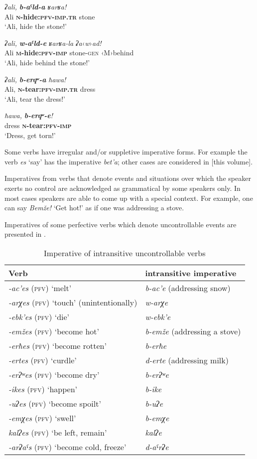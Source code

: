 ﻿\documentclass[output=paper]{langsci/langscibook}
\begin{document}
\ex %
\gll \emph{ʡali,} \emph{\textbf{b-aˤld-a}} \emph{ʁarʁa!}\\
Ali \textbf{\textsc{n}-hide:\textsc{pfv}-\textsc{imp}.\textsc{tr}} stone\\
\glt `Ali, hide the stone!'

\ex %
\gll \emph{ʡali,} \emph{\textbf{w-aˤld-e}} \emph{ʁarʁa-la} \emph{ʡa}‹\emph{w}›\emph{ad!}\\
Ali \textbf{\textsc{m}-hide:\textsc{pfv}-\textsc{imp}} stone-\textsc{gen} ‹M›behind\\
\glt `Ali, hide behind the stone!'

\ex %
\gll \emph{ʡali,} \emph{\textbf{b-erqʷ-a}} \emph{ħawa!}\\
Ali, \textbf{\textsc{n}-tear:\textsc{pfv}-\textsc{imp}.\textsc{tr}} dress\\
\glt `Ali, tear the dress!'

\ex %
\gll \emph{ħawa,} \emph{\textbf{b-erqʷ-e}!}\\
dress \textbf{\textsc{n}-tear:\textsc{pfv}-\textsc{imp}}\\
\glt `Dress, get torn!'
\z

Some verbs have irregular and/or suppletive imperative forms. For
example the verb \emph{es} `say' has the imperative \emph{bet'a}; other
cases are considered in \citet{daniel2019} [this volume].

Imperatives from verbs that denote events and situations over which
the speaker exerts no control are acknowledged as grammatical by some
speakers only. In most cases speakers are able to come up with a special
context. For example, one can say \emph{Bemže!} `Get hot!' as if one was addressing a stove.

Imperatives of some perfective verbs which denote uncontrollable events
are presented in .

\begin{table}
  \caption{Imperative of intransitive uncontrollable verbs}\label{tab:5:2}

  \begin{tabular}{@{}ll@{}}
\toprule
Verb & intransitive imperative\tabularnewline \midrule
\emph{-ac'es} (\textsc{pfv}) `melt' & \emph{b-ac'e} (addressing snow)\tabularnewline
\emph{-arχes} (\textsc{pfv}) `touch' (unintentionally) & \emph{w-arχe} \tabularnewline
\emph{-ebk'es} (\textsc{pfv}) `die' & \emph{w-ebk'e} \tabularnewline
\emph{-emžes} (\textsc{pfv}) `become hot' & \emph{b-emže} (addressing a stove) \tabularnewline
\emph{-erħes} (\textsc{pfv}) `become rotten' & \emph{b-erħe} \tabularnewline
\emph{-ertes} (\textsc{pfv}) `curdle' & \emph{d-erte} (addressing milk) \tabularnewline
\emph{-erʔʷes} (\textsc{pfv}) `become dry' & \emph{b-erʔʷe} \tabularnewline
\emph{-ikes} (\textsc{pfv}) `happen' & \emph{b-ike} \tabularnewline
\emph{-uʔes} (\textsc{pfv}) `become spoilt' & \emph{b-uʔe} \tabularnewline
\emph{-emχes} (\textsc{pfv}) `swell' & \emph{b-emχe} \tabularnewline
\emph{kalʔes} (\textsc{pfv}) `be left, remain' & \emph{kalʔe} \tabularnewline
\emph{-arʡaˤs} (\textsc{pfv}) `become cold, freeze' & \emph{d-aˤrʡe} \tabularnewline
\bottomrule
\end{tabular}
\end{table}
\end{document}
